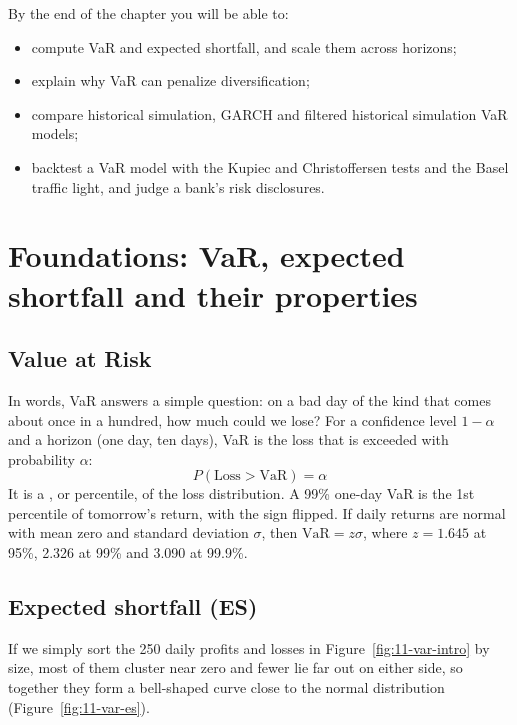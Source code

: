 By the end of the chapter you will be able to:

\begin{itemize}[nosep]
  \item compute VaR and expected shortfall, and scale them across horizons;
  \item explain why VaR can penalize diversification;
  \item compare historical simulation, GARCH and filtered historical simulation VaR models;
  \item backtest a VaR model with the Kupiec and Christoffersen tests and the Basel traffic light, and judge a bank's risk disclosures.
\end{itemize}


\section{Foundations: VaR, expected shortfall and their properties}
\label{sec:11-foundations}

\subsection{Value at Risk}

In words, VaR answers a simple question: on a bad day of the kind that comes about once in a hundred, how much could we lose? For a confidence level $1 - \alpha$ and a horizon (one day, ten days), VaR is the loss that is exceeded with probability $\alpha$:
\begin{equation}
  P(\text{Loss} > \mathrm{VaR}) = \alpha
  \label{eq:11-var}
\end{equation}
It is a , or percentile, of the loss distribution. A 99\% one-day VaR is the 1st percentile of tomorrow's return, with the sign flipped. If daily returns are normal with mean zero and standard deviation $\sigma$, then $\mathrm{VaR} = z\sigma$, where $z = 1.645$ at 95\%, 2.326 at 99\% and 3.090 at 99.9\%.

\subsection{Expected shortfall (ES)}
If we simply sort the 250 daily profits and losses in Figure~\ref{fig:11-var-intro} by size, most of them cluster near zero and fewer lie far out on either side, so together they form a bell-shaped curve close to the normal distribution (Figure~\ref{fig:11-var-es}). 

